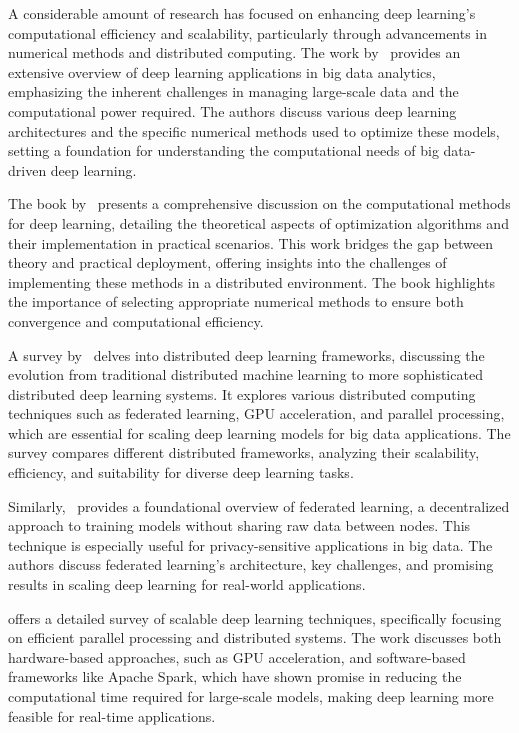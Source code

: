 
A considerable amount of research has focused on enhancing deep learning's computational efficiency and scalability, particularly through advancements in numerical methods and distributed computing. 
The work by~\cite{najafabadi2015deep} provides an extensive overview of deep learning applications in big data analytics, emphasizing the inherent challenges in managing large-scale data 
and the computational power required. The authors discuss various deep learning architectures and the specific numerical methods used to optimize these models, setting a foundation for understanding 
the computational needs of big data-driven deep learning.

The book by~\cite{yan2023computational} presents a comprehensive discussion on the computational methods for deep learning, detailing the theoretical aspects of optimization algorithms and their implementation in practical scenarios. This work bridges the gap between theory and practical deployment, offering insights into the challenges of implementing these methods in a distributed environment. The book highlights the importance of selecting appropriate numerical methods to ensure both convergence and computational efficiency.

A survey by~\cite{zhang2023distributed} delves into distributed deep learning frameworks, discussing the evolution from traditional distributed machine learning to more sophisticated distributed deep learning systems. It explores various distributed computing techniques such as federated learning, GPU acceleration, and parallel processing, which are essential for scaling deep learning models for big data applications. The survey compares different distributed frameworks, analyzing their scalability, efficiency, and suitability for diverse deep learning tasks.

Similarly,~\cite{li2019federated} provides a foundational overview of federated learning, a decentralized approach to training models without sharing raw data between nodes. This technique is especially useful for privacy-sensitive applications in big data. The authors discuss federated learning’s architecture, key challenges, and promising results in scaling deep learning for real-world applications.

\cite{li2020survey} offers a detailed survey of scalable deep learning techniques, specifically focusing on efficient parallel processing and distributed systems. The work discusses both hardware-based approaches, such as GPU acceleration, and software-based frameworks like Apache Spark, which have shown promise in reducing the computational time required for large-scale models, making deep learning more feasible for real-time applications.

